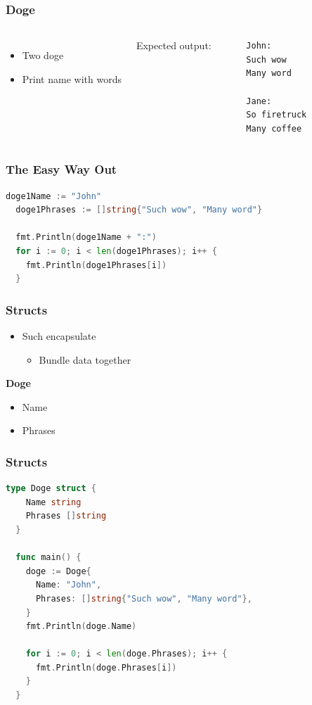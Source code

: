 \documentclass{beamer}
\begin{document}
\begin{frame}[fragile]
  \frametitle{Doge}
  \begin{columns}[c]
    \column{1.5in}
    \begin{itemize}
      \item Two doge
      \item Print name with words
    \end{itemize}

    \column{1.5in}
    Expected output:
    \begin{lstlisting}
    John:
    Such wow
    Many word
    
    Jane:
    So firetruck
    Many coffee
    \end{lstlisting}
    
  \end{columns}
\end{frame}

\begin{frame}[fragile]
  \frametitle{The Easy Way Out}

  \begin{lstlisting}[language=go]
  doge1Name := "John"
  doge1Phrases := []string{"Such wow", "Many word"}

  fmt.Println(doge1Name + ":")
  for i := 0; i < len(doge1Phrases); i++ {
    fmt.Println(doge1Phrases[i])
  }
  \end{lstlisting}
\end{frame}

\begin{frame}
  \frametitle{Structs}

  \begin{itemize}
    \item Such encapsulate
      \begin{itemize}
        \item Bundle data together
      \end{itemize}
  \end{itemize}

  \begin{framed}
    \textbf{Doge}
    
    \begin{itemize}
      \item Name
      \item Phrases
    \end{itemize}
  \end{framed}
\end{frame}

\begin{frame}[fragile]
  \frametitle{Structs}

  \begin{lstlisting}[language=go]
  type Doge struct {
    Name string
    Phrases []string
  }

  func main() {
    doge := Doge{
      Name: "John",
      Phrases: []string{"Such wow", "Many word"},
    }
    fmt.Println(doge.Name)

    for i := 0; i < len(doge.Phrases); i++ {
      fmt.Println(doge.Phrases[i])
    }
  }
  \end{lstlisting}
\end{frame}
\end{document}
